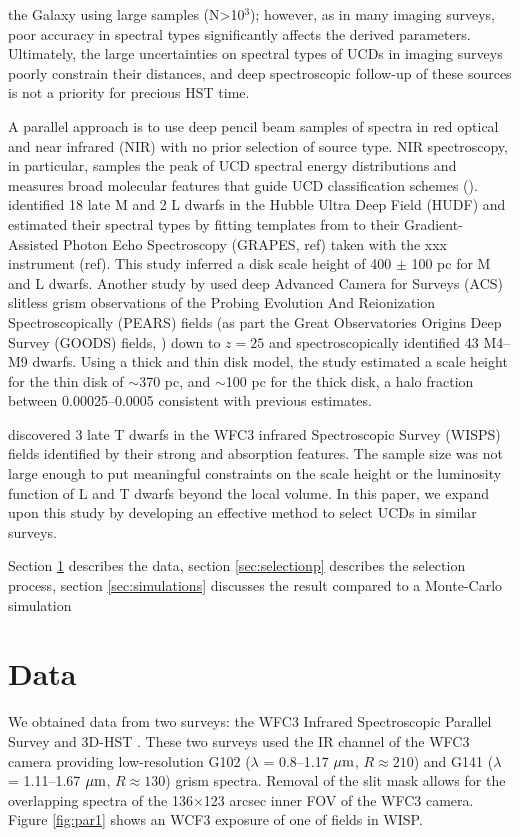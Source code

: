 \documentclass[manuscript]{aastex63}
\begin{document}
the Galaxy using large samples (N\textgreater 10$^3$); however, as in many imaging surveys, poor accuracy in spectral types significantly affects the derived parameters. Ultimately, the large uncertainties on spectral types  of UCDs in imaging surveys poorly constrain their distances, and deep spectroscopic follow-up of these sources is not a priority for precious HST time. 

A parallel approach is to use deep pencil beam samples of spectra in red optical and near infrared (NIR) with no prior selection of source type. NIR spectroscopy, in particular, samples the peak of UCD spectral energy distributions and measures broad molecular features that guide UCD classification schemes (\citealt{2005ARA&A..43..195K}). \citet{2005ApJ...622..319P} identified 18 late M and 2 L dwarfs in the Hubble Ultra Deep Field (HUDF) and estimated their spectral types by fitting templates from \citet{Kirkpatrick2000} to their Gradient-Assisted Photon Echo Spectroscopy (GRAPES, ref) taken with the xxx instrument (ref). This study inferred a disk scale height of 400 $\pm$ 100 pc for M and L dwarfs. Another study by \citet{2009ApJ...695.1591P} used deep Advanced Camera for Surveys (ACS) slitless grism observations of the Probing Evolution And Reionization Spectroscopically (PEARS) fields (as part the Great Observatories Origins Deep Survey (GOODS) fields, \citealt{Giavalisco2004}) down to $z=25$ and spectroscopically identified 43 M4--M9 dwarfs. Using a thick and thin disk model, the study estimated a scale height for the thin disk of $\sim$370 pc, and $\sim$100 pc for the thick disk, a halo fraction between 0.00025--0.0005 consistent with previous estimates. 

\citet{2012ApJ...752L..14M} discovered 3 late T dwarfs in the WFC3 infrared Spectroscopic Survey (WISPS) fields \citep{2010ApJ...723..104A} identified by their strong \meth and \wat absorption features. The sample size was not large enough to put meaningful constraints on the scale height or the luminosity function of L and T dwarfs beyond the local volume. In this paper, we expand upon this study by developing an effective method to select UCDs in similar surveys.

Section \ref{sec:data} describes the data, section \ref{sec:selectionp} describes the selection process, section \ref{sec:simulations} discusses the result compared to a Monte-Carlo simulation

\section{Data}\label{sec:data}
We obtained data from two surveys: the WFC3 Infrared Spectroscopic Parallel Survey \citep[WISPS;][]{2010ApJ...723..104A} and 3D-HST \citep{Momcheva2016,2012ApJS..200...13B,Skelton2014}. These two surveys used the IR channel of the WFC3 camera \citep{doi:10.1117/12.789581} providing low-resolution G102 ($\lambda$ = 0.8--1.17 $\mbox{$\mu$m}$, $R \approx 210$) and G141 ($\lambda$ = 1.11--1.67 $\mbox{$\mu$m}$, $R \approx 130$) grism spectra. Removal of the slit mask allows for the overlapping spectra of the 136$\times$123 arcsec inner FOV of the WFC3 camera. Figure \ref{fig:par1} shows an WCF3 exposure of one of fields in WISP.
\end{document}
